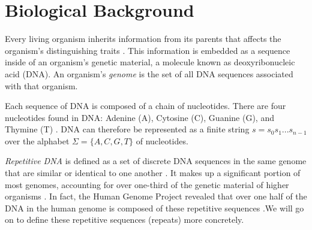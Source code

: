 \section{Biological Background}
Every living organism inherits information from its parents that affects the organism's distinguishing traits \cite{lewin2014lewins}. This information is embedded as a sequence inside of an organism's genetic material, a molecule known as deoxyribonucleic acid (DNA). An organism's \textit{genome} is the set of all DNA sequences associated with that organism.

Each sequence of DNA is composed of a chain of nucleotides. There are four nucleotides found in DNA: Adenine (A), Cytosine (C), Guanine (G), and Thymine (T)  \cite{elloumi2011algorithms}. DNA can therefore be represented as a finite string $s=s_{0}s_{1}...s_{n-1}$ over the alphabet $\Sigma=\lbrace A, C, G, T\rbrace$ of nucleotides.

\textit{Repetitive DNA} is defined as a set of discrete DNA sequences in the same genome that are similar or identical to one another \cite{treangen2012repetitive}. It makes up a significant portion of most genomes, accounting for over one-third of the genetic material of higher organisms \cite{britten1968repeated}. In fact, the Human Genome Project revealed that over one half of the DNA in the human genome is composed of these repetitive sequences \cite{lander2001initial}.We will go on to define these repetitive sequences (repeats) more concretely. 
  
 


